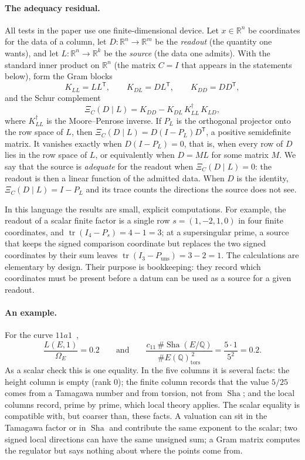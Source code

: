 \documentclass[11pt]{article}
\theoremstyle{definition}
\newcommand{\Q}{\mathbb{Q}}
\newcommand{\R}{\mathbb{R}}
\newcommand{\Sha}{\operatorname{Sha}}
\newcommand{\tors}{\operatorname{tors}}
\newcommand{\tr}{\operatorname{tr}}
\newcommand{\XiC}{\Xi_C(D\mid L)}        \newcommand{\KDD}{K_{DD}}
\newcommand{\KDL}{K_{DL}}
\newcommand{\KLL}{K_{LL}}
\newcommand{\Kdagger}{K_{LL}^{\dagger}}  \newcommand{\vsrc}{\mathrm{vsrc}}        \newcommand{\Jone}{J_1}
\begin{document}
\paragraph{The adequacy residual.}
All tests in the paper use one finite-dimensional device.  Let $x\in\R^n$
be coordinates for the data of a column, let $D:\R^n\to\R^m$ be the
\emph{readout} (the quantity one wants), and let $L:\R^n\to\R^k$ be the
\emph{source} (the data one admits).  With the standard inner product on
$\R^n$ (the matrix $C=I$ that appears in the statements below), form the
Gram blocks
\[
  \KLL=LL^{\mathsf T},\qquad \KDL=DL^{\mathsf T},\qquad \KDD=DD^{\mathsf T},
\]
and the Schur complement~\citep{Zhang2005schur,HornJohnson2013}
\[
  \XiC=\KDD-\KDL\,\Kdagger\,K_{LD},
\]
where $\Kdagger$ is the Moore--Penrose inverse.  If $P_L$ is the orthogonal
projector onto the row space of $L$, then $\XiC=D(I-P_L)D^{\mathsf T}$,
a positive semidefinite matrix.  It vanishes exactly when $D(I-P_L)=0$,
that is, when every row of $D$ lies in the row space of $L$, or
equivalently when $D=ML$ for some matrix $M$.  We say that the source is
\emph{adequate} for the readout when $\XiC=0$: the readout is then a
linear function of the admitted data.  When $D$ is the identity, $\XiC=I-P_L$
and its trace counts the directions the source does not see.

In this language the results are small, explicit computations.  For
example, the readout of a scalar finite factor is a single row
$s=(1,-2,1,0)$ in four finite coordinates, and $\tr(I_4-P_s)=4-1=3$; at
a supersingular prime, a source that keeps the signed comparison
coordinate but replaces the two signed coordinates by their sum leaves
$\tr(I_3-P_{\mathrm{uns}})=3-2=1$.  The calculations are elementary
by design.  Their purpose is bookkeeping: they record which coordinates
must be present before a datum can be used as a source for a given
readout.

\paragraph{An example.}
For the curve $11a1$~\citep{Cremona1997,LMFDB},
\[
  \frac{L(E,1)}{\Omega_E}=0.2
  \qquad\text{and}\qquad
  \frac{c_{11}\,\#\Sha(E/\Q)}{\#E(\Q)_{\tors}^{\,2}}
  =\frac{5\cdot1}{5^2}=0.2 .
\]
As a scalar check this is one equality.  In the five columns it is several
facts: the height column is empty (rank $0$); the finite column records
that the value $5/25$ comes from a Tamagawa number and from torsion, not
from $\Sha$; and the local columns record, prime by prime, which local
theory applies.  The scalar equality is compatible with, but coarser
than, these facts.  A valuation can sit in the Tamagawa factor or in
$\Sha$ and contribute the same exponent to the scalar; two signed local
directions can have the same unsigned sum; a Gram matrix computes the
regulator but says nothing about where the points come from.
\end{document}
